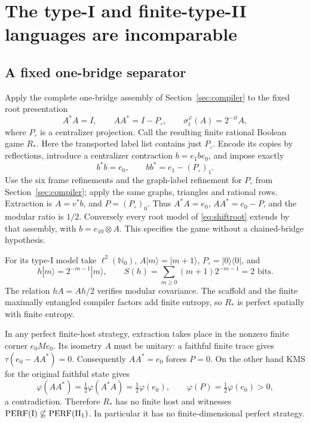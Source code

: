
\section{The type-I and finite-type-II languages are incomparable}\label{sec:sep}
\subsection{A fixed one-bridge separator}\label{sec:shiftseparator}
Apply the complete one-bridge assembly of Section~\ref{sec:compiler}
to the fixed root presentation
\begin{equation}\label{eq:shiftroot}
 A^*A=I,\qquad AA^*=I-P_\circ,\qquad
 \sigma_t^\varphi(A)=2^{-it}A,
\end{equation}
where $P_\circ$ is a centralizer projection. Call the resulting
finite rational Boolean game $R_*$. Here the transported label list
contains just $P_\circ$. Encode its copies by reflections, introduce
a centralizer contraction $b=e_1be_0$, and impose exactly
\[
 b^*b=e_0,\qquad bb^*=e_1-(P_\circ)_1.
\]
Use the six frame refinements and the graph-label refinement for
$P_\circ$ from Section~\ref{sec:compiler}; apply the same graphs,
triangles and rational rows. Extraction is $A=v^*b$, and
$P=(P_\circ)_0$. Thus $A^*A=e_0$, $AA^*=e_0-P$, and the modular
ratio is $1/2$. Conversely every root model of
\eqref{eq:shiftroot} extends by that assembly, with $b=e_{10}\otimes A$.
This specifies the game without a chained-bridge hypothesis.

For its type-I model take $\ell^2(\mathbb N_0)$,
$A|m\rangle=|m+1\rangle$, $P_\circ=|0\rangle\langle0|$, and
\[
 h|m\rangle=2^{-m-1}|m\rangle,\qquad
 S(h)=\sum_{m\geq0}(m+1)2^{-m-1}=2\text{ bits}.
\]
The relation $hA=Ah/2$ verifies modular covariance.
The scaffold and the finite maximally entangled compiler factors
add finite entropy, so $R_*$ is perfect spatially with finite entropy.

In any perfect finite-host strategy, extraction takes place in the
nonzero finite corner $e_0Me_0$. Its isometry $A$ must be unitary:
a faithful finite trace gives $\tau(e_0-AA^*)=0$. Consequently
$AA^*=e_0$ forces $P=0$. On the other hand KMS for the original
faithful state gives
\[
 \varphi(AA^*)=\tfrac12\varphi(A^*A)=\tfrac12\varphi(e_0),
 \qquad \varphi(P)=\tfrac12\varphi(e_0)>0,
\]
a contradiction. Therefore $R_*$ has no finite host and witnesses
$\mathrm{PERF}(\mathrm I)\not\subseteq\mathrm{PERF}(\mathrm{II}_1)$.
In particular it has no finite-dimensional perfect strategy.

